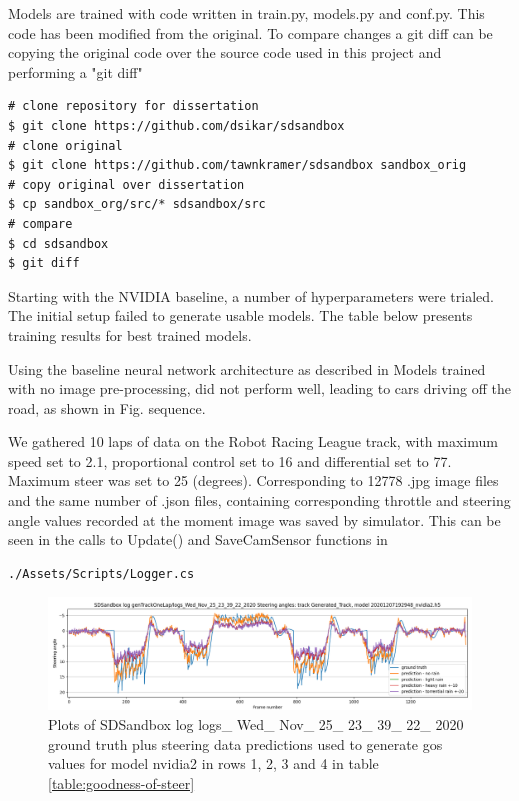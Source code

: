 Models are trained with code written in train.py, models.py and conf.py. This code has been modified from the original. To compare changes a git diff can be copying the original code over the source code used in this project and performing a "git diff"
\begin{verbatim}
# clone repository for dissertation
$ git clone https://github.com/dsikar/sdsandbox
# clone original
$ git clone https://github.com/tawnkramer/sdsandbox sandbox_orig
# copy original over dissertation
$ cp sandbox_org/src/* sdsandbox/src
# compare
$ cd sdsandbox 
$ git diff
\end{verbatim}


Starting with the NVIDIA baseline, a number of hyperparameters were trialed. The initial setup failed to generate usable models. 
The table below presents training results for best trained models.



Using the baseline neural network architecture as described in 
Models trained with no image pre-processing, did not perform well, leading to cars driving off the road, as shown in Fig.  sequence.

We gathered 10 laps of data on the Robot Racing League track, with maximum speed set to 2.1, proportional control set to 16 and differential set to 77. Maximum steer was set to 25 (degrees). Corresponding to 12778 .jpg image files and the same number of  .json files, containing corresponding throttle and steering angle values recorded at the moment image was saved by simulator. This can be seen in the calls to Update() and SaveCamSensor functions in  
\begin{verbatim}
./Assets/Scripts/Logger.cs
\end{verbatim}



\begin{figure}[ht]
 \centering 
 \includegraphics[width=\textwidth]{Figures/sa_Generated_Track_20201207192948_nvidia2.h5.png}
 \caption{Plots of SDSandbox log logs\_ Wed\_ Nov\_ 25\_ 23\_ 39\_ 22\_ 2020 ground truth plus steering data predictions used to generate gos values for model nvidia2 in rows 1, 2, 3 and 4 in table \ref{table:goodness-of-steer}}
 \label{fig:sa_Generated_Track_20201207192948_nvidia2.h5} 
\end{figure}

